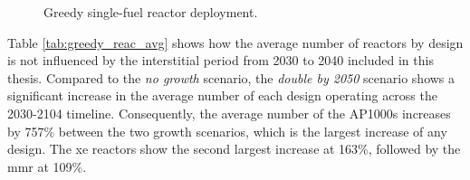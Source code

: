 \begin{figure}[H]
  \hfill
  \caption{Greedy single-fuel reactor deployment.}
  \label{fig:greedy_of_reactors}
\end{figure}

Table \ref{tab:greedy_reac_avg} shows how the average number of reactors by design is not influenced by the interstitial period from 2030 to 2040 included in this thesis. Compared to the \textit{no growth} scenario, the \textit{double by 2050} scenario shows a significant increase in the average number of each design operating across the 2030-2104 timeline. Consequently, the average number of the AP1000s increases by 757\% between the two growth scenarios, which is the largest increase of any design. The \gls{xe} reactors show the second largest increase at 163\%, followed by the \gls{mmr} at 109\%.


